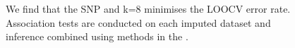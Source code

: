 \begin{figure}[h]
{%
We find that the SNP  and k=8 minimises the \Gls{LOOCV} error rate.  
Association tests are conducted on each imputed dataset and inference combined using methods in the .
}
\end{figure} 



%
%


